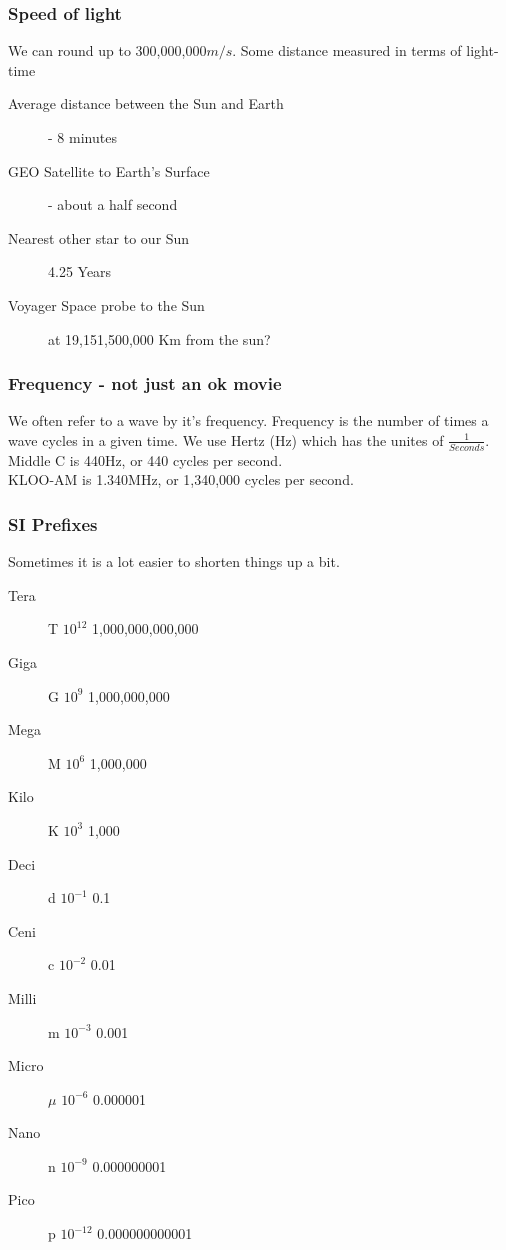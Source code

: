 \documentclass[10pt]{beamer}
\begin{document}
\begin{frame}
\frametitle{Speed of light}
We can round up to 300,000,000$m/s$. Some distance measured in terms of light-time
\begin{description}
\item[Average distance between the Sun and Earth] - 8 minutes
\item[GEO Satellite to Earth's Surface] - about a half second
\item[Nearest other star to our Sun] 4.25 Years
\item[Voyager Space probe to the Sun] at 19,151,500,000 Km from the sun?  
\end{description}
\end{frame}

\begin{frame}
\frametitle{Frequency - not just an ok movie}
We often refer to a wave by it's frequency. Frequency is the number of times a wave cycles in a given time. We use Hertz (Hz) which has the unites of $\frac{1}{Seconds}$.\\
Middle C is 440Hz, or 440 cycles per second.\\
KLOO-AM is 1.340MHz, or 1,340,000 cycles per second.
\end{frame}

\begin{frame}
\frametitle{SI Prefixes}
Sometimes it is a lot easier to shorten things up a bit.
\begin{description}
\item[Tera]T $10^{12}$ 1,000,000,000,000
\item[Giga]G $10^9$ 1,000,000,000
\item[Mega]M $10^6$ 1,000,000
\item[Kilo]K $10^3$ 1,000
\item[Deci]d $10^{-1}$ 0.1
\item[Ceni]c $10^{-2}$ 0.01
\item[Milli]m $10^{-3}$ 0.001
\item[Micro]$\mu$ $10^{-6}$ 0.000001
\item[Nano]n $10^{-9}$ 0.000000001
\item[Pico]p $10^{-12}$ 0.000000000001
\end{description}
\end{frame}
\end{document}
